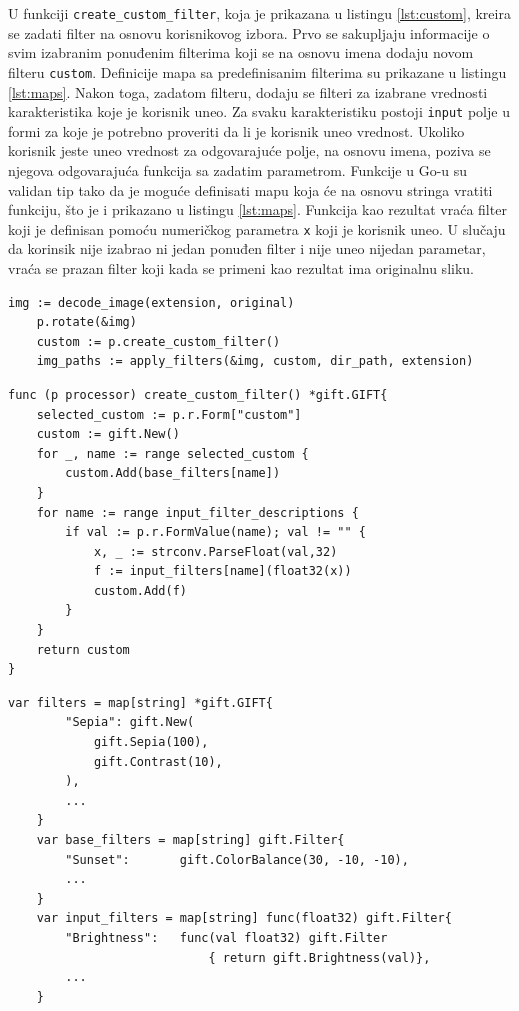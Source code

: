 \documentclass[12pt,oneside]{memoir}
\begin{document}
 U funkciji  \texttt{create\_custom\_filter}, koja je prikazana u listingu \ref{lst:custom}, kreira se zadati filter na osnovu korisnikovog izbora. Prvo se sakupljaju informacije o svim izabranim ponuđenim filterima koji se na osnovu imena dodaju novom filteru  \texttt{custom}. Definicije mapa sa predefinisanim filterima su prikazane u listingu \ref{lst:maps}. Nakon toga, zadatom filteru, dodaju se filteri za izabrane vrednosti karakteristika koje je korisnik uneo. Za svaku karakteristiku postoji \texttt{input} polje u formi za koje je potrebno proveriti da li je korisnik uneo vrednost. Ukoliko korisnik jeste uneo vrednost za odgovarajuće polje, na osnovu imena, poziva se njegova odgovarajuća funkcija sa zadatim parametrom. Funkcije u Go-u su validan tip tako da je moguće definisati mapu koja će na osnovu stringa vratiti funkciju, što je i prikazano u listingu \ref{lst:maps}. Funkcija kao rezultat vraća filter koji je definisan pomoću numeričkog parametra  \texttt{x} koji je korisnik uneo. U slučaju da korinsik nije izabrao ni jedan ponuđen filter i nije uneo nijedan parametar, vraća se prazan filter koji kada se primeni kao rezultat ima originalnu sliku.

\begin{center}
\begin{lstlisting}[caption=Primena filtera u funkciji ImageHandler,label={lst:IHfilter},  backgroundcolor=\color{background}]
	img := decode_image(extension, original)
	p.rotate(&img)
	custom := p.create_custom_filter()
	img_paths := apply_filters(&img, custom, dir_path, extension)
\end{lstlisting}
\end{center}

\begin{center}
\begin{lstlisting}[caption=Funkcija za kreiranje zadatog filtera,label={lst:custom}, backgroundcolor=\color{background},belowskip=-0.8 \baselineskip]
func (p processor) create_custom_filter() *gift.GIFT{
	selected_custom := p.r.Form["custom"]
	custom := gift.New()
	for _, name := range selected_custom {
		custom.Add(base_filters[name])
	}
	for name := range input_filter_descriptions {
		if val := p.r.FormValue(name); val != "" {
			x, _ := strconv.ParseFloat(val,32)
			f := input_filters[name](float32(x))
			custom.Add(f)
		}
	}
	return custom
}
\end{lstlisting}
\end{center}

\begin{center}
\begin{lstlisting}[caption=Mape koje se koriste za definisanje različitih vrsta filtera,label={lst:maps},  backgroundcolor=\color{background}]
	var filters = map[string] *gift.GIFT{
		"Sepia": gift.New(
			gift.Sepia(100),
			gift.Contrast(10),
		),
		...
	}
	var base_filters = map[string] gift.Filter{
		"Sunset":      	gift.ColorBalance(30, -10, -10),
		...
	}
	var input_filters = map[string] func(float32) gift.Filter{
		"Brightness":	func(val float32) gift.Filter 
							{ return gift.Brightness(val)},
		...
	}
\end{lstlisting}
\end{center}
\end{document}
